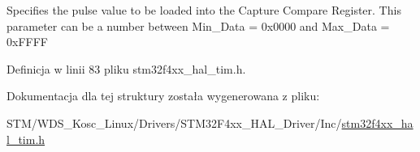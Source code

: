 Specifies the pulse value to be loaded into the Capture Compare Register. This parameter can be a number between Min\+\_\+\+Data = 0x0000 and Max\+\_\+\+Data = 0x\+F\+F\+FF 

Definicja w linii 83 pliku stm32f4xx\+\_\+hal\+\_\+tim.\+h.



Dokumentacja dla tej struktury została wygenerowana z pliku\+:\begin{DoxyCompactItemize}
\item 
S\+T\+M/\+W\+D\+S\+\_\+\+Kosc\+\_\+\+Linux/\+Drivers/\+S\+T\+M32\+F4xx\+\_\+\+H\+A\+L\+\_\+\+Driver/\+Inc/\hyperlink{stm32f4xx__hal__tim_8h}{stm32f4xx\+\_\+hal\+\_\+tim.\+h}\end{DoxyCompactItemize}
